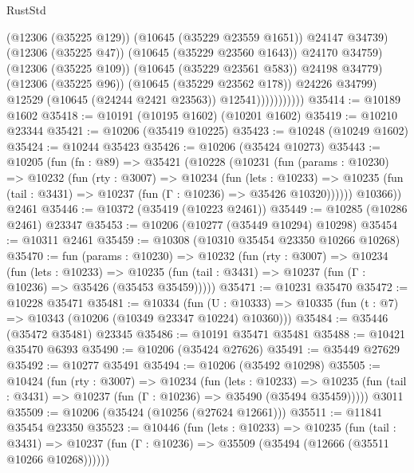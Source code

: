 \begin{lexlean}{RustStd}
\begin{coremodule}
                                  (@12306 (@35225 @129))
                                  (@10645 (@35229 @23559 @1651))
                                  @24147
                                  @34739)
                                (@12306 (@35225 @47))
                                (@10645 (@35229 @23560 @1643))
                                @24170
                                @34759)
                              (@12306 (@35225 @109))
                              (@10645 (@35229 @23561 @583))
                              @24198
                              @34779)
                            (@12306 (@35225 @96))
                            (@10645 (@35229 @23562 @178))
                            @24226
                            @34799)
                          @12529
                          (@10645 (@24244 @2421 @23563))
                          @12541)))))))))))
@35414 := @10189 @1602
@35418 := @10191 (@10195 @1602) (@10201 @1602)
@35419 := @10210 @23344
@35421 := @10206 (@35419 @10225)
@35423 := @10248 (@10249 @1602)
@35424 := @10244 @35423
@35426 := @10206 (@35424 @10273)
@35443 := @10205
    (fun (fn : @89) =>
    @35421
      (@10228
        (@10231
          (fun (params : @10230) =>
          @10232
            (fun (rty : @3007) =>
            @10234
              (fun (lets : @10233) =>
              @10235 (fun (tail : @3431) => @10237 (fun (Γ : @10236) => @35426 @10320))))))
        @10366))
    @2461
@35446 := @10372 (@35419 (@10223 @2461))
@35449 := @10285 (@10286 @2461) @23347
@35453 := @10206 (@10277 (@35449 @10294) @10298)
@35454 := @10311 @2461
@35459 := @10308 (@10310 @35454 @23350 @10266 @10268)
@35470 := fun (params : @10230) =>
  @10232
    (fun (rty : @3007) =>
    @10234
      (fun (lets : @10233) =>
      @10235 (fun (tail : @3431) => @10237 (fun (Γ : @10236) => @35426 (@35453 @35459)))))
@35471 := @10231 @35470
@35472 := @10228 @35471
@35481 := @10334
    (fun (U : @10333) => @10335 (fun (t : @7) => @10343 (@10206 (@10349 @23347 @10224) @10360)))
@35484 := @35446 (@35472 @35481) @23345
@35486 := @10191 @35471 @35481
@35488 := @10421 @35470 @6393
@35490 := @10206 (@35424 @27626)
@35491 := @35449 @27629
@35492 := @10277 @35491
@35494 := @10206 (@35492 @10298)
@35505 := @10424
    (fun (rty : @3007) =>
    @10234
      (fun (lets : @10233) =>
      @10235 (fun (tail : @3431) => @10237 (fun (Γ : @10236) => @35490 (@35494 @35459)))))
    @3011
@35509 := @10206 (@35424 (@10256 (@27624 @12661)))
@35511 := @11841 @35454 @23350
@35523 := @10446
    (fun (lets : @10233) =>
    @10235
      (fun (tail : @3431) =>
      @10237 (fun (Γ : @10236) => @35509 (@35494 (@12666 (@35511 @10266 @10268))))))

\end{coremodule}
\end{lexlean}

